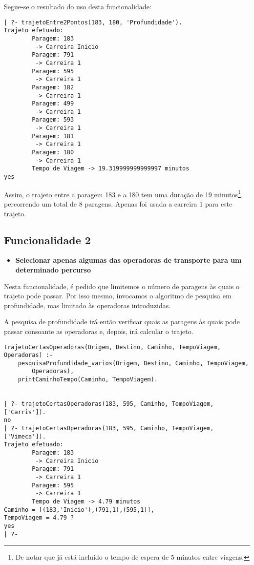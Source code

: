 \documentclass[a4paper,12pt]{report}
\begin{document}
\par Segue-se o resultado do uso desta funcionalidade:

\begin{verbatim}
| ?- trajetoEntre2Pontos(183, 180, 'Profundidade').   
Trajeto efetuado: 
        Paragem: 183
         -> Carreira Inicio
        Paragem: 791
         -> Carreira 1
        Paragem: 595
         -> Carreira 1
        Paragem: 182
         -> Carreira 1
        Paragem: 499
         -> Carreira 1
        Paragem: 593
         -> Carreira 1
        Paragem: 181
         -> Carreira 1
        Paragem: 180
         -> Carreira 1
        Tempo de Viagem -> 19.319999999999997 minutos
yes
\end{verbatim}

\par Assim, o trajeto entre a paragem 183 e a 180 tem uma duração de 19 minutos\footnote{De notar que já está incluído o tempo de espera de 5 minutos entre viagens.} percorrendo um total de 8 paragens. Apenas foi usada a carreira 1 para este trajeto.

\vspace{1cm}

\subsection{Funcionalidade 2}
\begin{itemize}
    \item \textbf{Selecionar apenas algumas das operadoras de transporte para um determinado percurso}
\end{itemize}
\par Nesta funcionalidade, é pedido que limitemos o número de paragens às quais o trajeto pode passar. Por isso mesmo, invocamos o algoritmo de pesquisa em profundidade, mas limitado às operadoras introduzidas.
\par A pesquisa de profundidade irá então verificar quais as paragens às quais pode passar consoante as operadoras e, depois, irá calcular o trajeto.


\begin{verbatim}
trajetoCertasOperadoras(Origem, Destino, Caminho, TempoViagem,
Operadoras) :-    
    pesquisaProfundidade_varios(Origem, Destino, Caminho, TempoViagem,
        Operadoras),
    printCaminhoTempo(Caminho, TempoViagem).
    

| ?- trajetoCertasOperadoras(183, 595, Caminho, TempoViagem, ['Carris']).
no
| ?- trajetoCertasOperadoras(183, 595, Caminho, TempoViagem, ['Vimeca']).
Trajeto efetuado: 
        Paragem: 183
         -> Carreira Inicio
        Paragem: 791
         -> Carreira 1
        Paragem: 595
         -> Carreira 1
        Tempo de Viagem -> 4.79 minutos
Caminho = [(183,'Inicio'),(791,1),(595,1)],
TempoViagem = 4.79 ? 
yes
| ?-
\end{verbatim}
\end{document}
